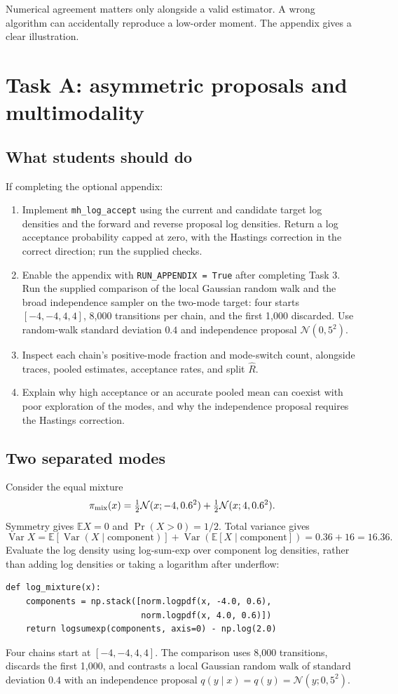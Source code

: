 \documentclass[11pt,a4paper]{article}
\newcommand{\E}{\mathbb E}
\newcommand{\Var}{\operatorname{Var}}
\newcommand{\Normal}{\mathcal N}
\begin{document}
Numerical agreement matters only alongside a valid estimator. A wrong
algorithm can accidentally reproduce a low-order moment. The appendix gives
a clear illustration.

\appendix
\section{Task A: asymmetric proposals and multimodality}
\subsection{What students should do}
If completing the optional appendix:
\begin{enumerate}
\item Implement \texttt{mh\_log\_accept} using the current and candidate
target log densities and the forward and reverse proposal log densities.
Return a log acceptance probability capped at zero, with the Hastings
correction in the correct direction; run the supplied checks.
\item Enable the appendix with \texttt{RUN\_APPENDIX = True} after completing
Task 3. Run the supplied comparison of the local Gaussian random walk and
the broad independence sampler on the two-mode target: four starts
$[-4,-4,4,4]$, 8,000 transitions per chain, and the first 1,000 discarded.
Use random-walk standard deviation $0.4$ and independence proposal
$\Normal(0,5^2)$.
\item Inspect each chain's positive-mode fraction and mode-switch count,
alongside traces, pooled estimates, acceptance rates, and split
$\widehat R$.
\item Explain why high acceptance or an accurate pooled mean can coexist
with poor exploration of the modes, and why the independence proposal
requires the Hastings correction.
\end{enumerate}

\subsection{Two separated modes}
Consider the equal mixture
\[
 \pi_{\rm mix}(x)=\tfrac12\Normal(x;-4,0.6^2)
                  +\tfrac12\Normal(x;4,0.6^2).
\]
Symmetry gives $\E X=0$ and $\Pr(X>0)=1/2$. Total variance gives
\[
 \Var X=\E[\Var(X\mid\text{component})]
         +\Var(\E[X\mid\text{component}])=0.36+16=16.36.
\]
Evaluate the log density using log-sum-exp over component log densities,
rather than adding log densities or taking a logarithm after underflow:
\begin{lstlisting}
def log_mixture(x):
    components = np.stack([norm.logpdf(x, -4.0, 0.6),
                           norm.logpdf(x, 4.0, 0.6)])
    return logsumexp(components, axis=0) - np.log(2.0)
\end{lstlisting}
Four chains start at $[-4,-4,4,4]$. The comparison uses 8,000 transitions,
discards the first 1,000, and contrasts a local Gaussian random walk of
standard deviation $0.4$ with an independence proposal
$q(y\mid x)=q(y)=\Normal(y;0,5^2)$.
\end{document}
